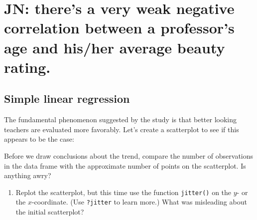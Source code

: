 \documentclass[]{article}
\newenvironment{Shaded}{\begin{snugshade}}{\end{snugshade}}
\newcommand{\KeywordTok}[1]{\textcolor[rgb]{0.13,0.29,0.53}{\textbf{#1}}}
\newcommand{\StringTok}[1]{\textcolor[rgb]{0.31,0.60,0.02}{#1}}
\newcommand{\OperatorTok}[1]{\textcolor[rgb]{0.81,0.36,0.00}{\textbf{#1}}}
\newcommand{\NormalTok}[1]{#1}
\providecommand{\tightlist}{%
  \setlength{\itemsep}{0pt}\setlength{\parskip}{0pt}}
\begin{document}
\section{JN: there's a very weak negative correlation between a
professor's age and his/her average beauty
rating.}\label{jn-theres-a-very-weak-negative-correlation-between-a-professors-age-and-hisher-average-beauty-rating.}

\subsection{Simple linear regression}\label{simple-linear-regression}

The fundamental phenomenon suggested by the study is that better looking
teachers are evaluated more favorably. Let's create a scatterplot to see
if this appears to be the case:

\begin{Shaded}
\end{Shaded}

Before we draw conclusions about the trend, compare the number of
observations in the data frame with the approximate number of points on
the scatterplot. Is anything awry?

\begin{enumerate}
\def\labelenumi{\arabic{enumi}.}
\setcounter{enumi}{3}
\tightlist
\item
  Replot the scatterplot, but this time use the function
  \texttt{jitter()} on the \(y\)- or the \(x\)-coordinate. (Use
  \texttt{?jitter} to learn more.) What was misleading about the initial
  scatterplot?
\end{enumerate}

\begin{Shaded}
\end{Shaded}
\end{document}
